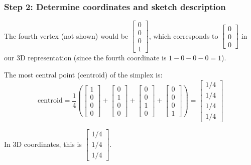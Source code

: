 \documentclass{article}
\begin{document}
\subsubsection*{Step 2: Determine coordinates and sketch description}
\parbox{\textwidth}{
The fourth vertex (not shown) would be $\begin{bmatrix} 0 \\ 0 \\ 0 \\ 1 \end{bmatrix}$, which corresponds to $\begin{bmatrix} 0 \\ 0 \\ 0 \end{bmatrix}$ in our 3D representation (since the fourth coordinate is $1 - 0 - 0 - 0 = 1$).

The most central point (centroid) of the simplex is:
$$\text{centroid} = \frac{1}{4}\left(\begin{bmatrix} 1 \\ 0 \\ 0 \\ 0 \end{bmatrix} + \begin{bmatrix} 0 \\ 1 \\ 0 \\ 0 \end{bmatrix} + \begin{bmatrix} 0 \\ 0 \\ 1 \\ 0 \end{bmatrix} + \begin{bmatrix} 0 \\ 0 \\ 0 \\ 1 \end{bmatrix}\right) = \begin{bmatrix} 1/4 \\ 1/4 \\ 1/4 \\ 1/4 \end{bmatrix}$$

In 3D coordinates, this is $\begin{bmatrix} 1/4 \\ 1/4 \\ 1/4 \end{bmatrix}$.

}
\end{document}
